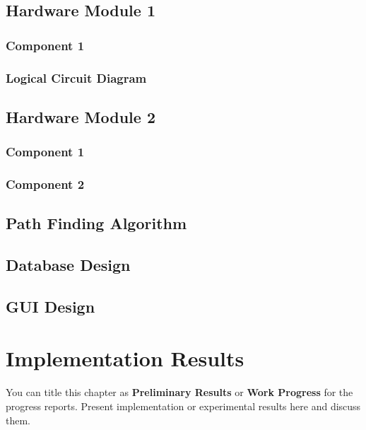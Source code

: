 \documentclass[12pt,oneside,openright,a4paper]{cpe-english-project}
\begin{document}
\section{Hardware Module 1}
\subsection{Component 1}
\subsection{Logical Circuit Diagram}

\section{Hardware Module 2}
\subsection{Component 1}
\subsection{Component 2}

\section{Path Finding Algorithm}

\section{Database Design}

\section{GUI Design}



\chapter{Implementation Results}

You can title this chapter as \textbf{Preliminary Results} or \textbf{Work Progress} for the progress reports. Present implementation or experimental results here and discuss them.

\end{document}
